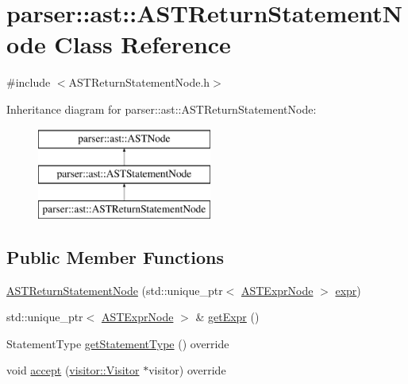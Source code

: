 \hypertarget{classparser_1_1ast_1_1ASTReturnStatementNode}{}\section{parser\+:\+:ast\+:\+:A\+S\+T\+Return\+Statement\+Node Class Reference}
\label{classparser_1_1ast_1_1ASTReturnStatementNode}


{\ttfamily \#include $<$A\+S\+T\+Return\+Statement\+Node.\+h$>$}

Inheritance diagram for parser\+:\+:ast\+:\+:A\+S\+T\+Return\+Statement\+Node\+:\begin{figure}[H]
\begin{center}
\leavevmode
\includegraphics[height=3.000000cm]{dd/d96/classparser_1_1ast_1_1ASTReturnStatementNode}
\end{center}
\end{figure}
\subsection*{Public Member Functions}
\begin{DoxyCompactItemize}
\item 
\hyperlink{classparser_1_1ast_1_1ASTReturnStatementNode_aa88792926907901c21090c2ad0203209}{A\+S\+T\+Return\+Statement\+Node} (std\+::unique\+\_\+ptr$<$ \hyperlink{classparser_1_1ast_1_1ASTExprNode}{A\+S\+T\+Expr\+Node} $>$ \hyperlink{classparser_1_1ast_1_1ASTReturnStatementNode_af0ee45b3faee9a37d6a36f7670a586f1}{expr})
\item 
std\+::unique\+\_\+ptr$<$ \hyperlink{classparser_1_1ast_1_1ASTExprNode}{A\+S\+T\+Expr\+Node} $>$ \& \hyperlink{classparser_1_1ast_1_1ASTReturnStatementNode_a6e10c7499773278d36493d9a9545438a}{get\+Expr} ()
\item 
Statement\+Type \hyperlink{classparser_1_1ast_1_1ASTReturnStatementNode_a8e1fdae4c10f1e3349b244914e5117be}{get\+Statement\+Type} () override
\item 
void \hyperlink{classparser_1_1ast_1_1ASTReturnStatementNode_ac66c375bc67277468711fdec08e93b15}{accept} (\hyperlink{classvisitor_1_1Visitor}{visitor\+::\+Visitor} $\ast$visitor) override
\end{DoxyCompactItemize}

